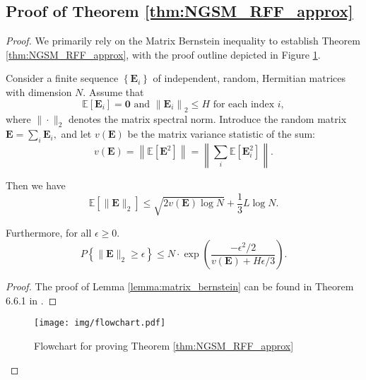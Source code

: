 \subsection{Proof of Theorem \ref{thm:NGSM_RFF_approx}}
\label{app:proof_theorem_4}
\begin{proof}
We primarily rely on the Matrix Bernstein inequality \citep{tropp2015introduction} to establish Theorem \ref{thm:NGSM_RFF_approx}, with the proof outline depicted in Figure \ref{fig:Flowchart for Proving Theorem 4}. 
    \!
    \begin{lemma} \label{lemma:matrix_bernstein}
    Consider a finite sequence $\left\{\mathbf{E}_i\right\}$ of independent, random, Hermitian matrices with dimension $N$. Assume that
    $$
    \mathbb{E} [\mathbf{E}_i] =\mathbf{0} \text {  and  }  \left\|\mathbf{E}_i\right\|_2 \leq H \text {  for each index } i,
    $$ where $\|\cdot\|_2$ denotes the matrix spectral norm.  Introduce the random matrix
    $
    \mathbf{E}=\sum_i \mathbf{E}_i,
    $ 
    and let $v(\mathbf{E})$ be the matrix variance statistic of the sum:
    $$
    v(\mathbf{E})=\left\|\mathbb{E} [\mathbf{E}^2]\right\|=\left\|\sum_i \mathbb{E} [\mathbf{E}_i^2]\right\| .
    $$
    
    Then we have
    \begin{equation}
        \mathbb{E} \left[\|\mathbf{E}\|_2 \right] \leq \sqrt{2 v(\mathbf{E}) \log N}+\frac{1}{3} L \log N .
    \end{equation}
    
    Furthermore, for all $\epsilon \geq 0$.
    \begin{equation}
        {P}\left\{ \|\mathbf{E}\|_2 \geq \epsilon \right\} \leq N \cdot \exp \left(\frac{-\epsilon^2 / 2}{v(\mathbf{E})+H \epsilon / 3}\right).
    \end{equation}
    \end{lemma}
    \begin{proof}
        The proof of Lemma \ref{lemma:matrix_bernstein} can be found in {Theorem 6.6.1} in \cite{tropp2015introduction}. 
    \end{proof}
    \vspace{.1in}


\begin{figure}[t!]
    \vspace{-.1in}
    \centering
    \texttt{[image: img/flowchart.pdf]} 
    \caption{Flowchart for proving Theorem \ref{thm:NGSM_RFF_approx} }
    \vspace{-0.2in}
    \label{fig:Flowchart for Proving Theorem 4}
\end{figure}



\end{proof}
